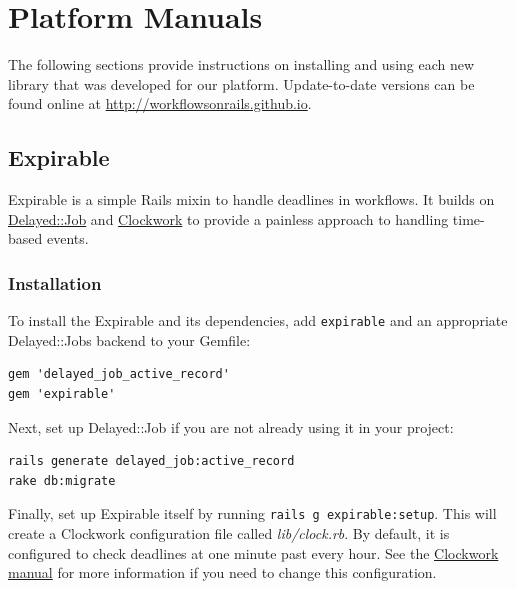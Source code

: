 \documentclass[document.tex]{subfiles}
\begin{document}
\chapter{Platform Manuals}
\label {ch:appendix-manuals}

The following sections provide instructions on installing and using each new library that was developed for our platform. Update-to-date versions can be found online at \url{http://workflowsonrails.github.io}.


\section{Expirable}
\label {sec:expirable-manual}

Expirable is a simple Rails mixin to handle deadlines in workflows.
It builds on \href{https://github.com/collectiveidea/delayed\_job}{Delayed::Job}
and \href{https://github.com/tomykaira/clockwork}{Clockwork} to provide a painless approach
to handling time-based events.

\subsection{Installation}

To install the Expirable and its dependencies, add {\tt expirable} and an
appropriate Delayed::Jobs backend to your Gemfile:

\begin{lstlisting}
gem 'delayed_job_active_record'
gem 'expirable'

\end{lstlisting}   %

Next, set up Delayed::Job if you are not already using it in your project:

\begin{lstlisting}
rails generate delayed_job:active_record
rake db:migrate

\end{lstlisting}   %

Finally, set up Expirable itself by running {\tt rails g expirable:setup}.
This will create a Clockwork configuration file called \emph{lib/clock.rb}.
By default, it is configured to check deadlines at one minute past every hour.
See the \href{https://github.com/tomykaira/clockwork\#clockwork---a-clock-process-to-replace-cron--}{Clockwork manual}
for more information if you need to change this configuration.
\end{document}

